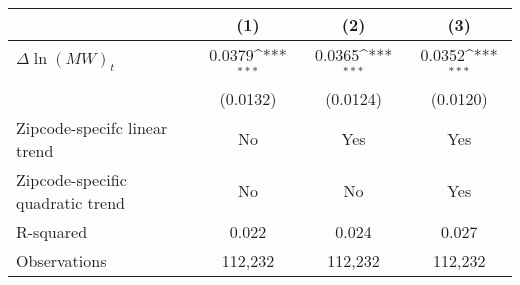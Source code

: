{
\def\sym#1{\ifmmode^{#1}\else\(^{#1}\)\fi}
\begin{tabular}{l*{3}{c}}
\hline\hline
          &\multicolumn{1}{c}{(1)}         &\multicolumn{1}{c}{(2)}         &\multicolumn{1}{c}{(3)}         \\
\hline
$\Delta \ln(MW)_{t}$&   0.0379\sym{***}&   0.0365\sym{***}&   0.0352\sym{***}\\
          & (0.0132)         & (0.0124)         & (0.0120)         \\
\hline
Zipcode-specifc linear trend&       No         &      Yes         &      Yes         \\
Zipcode-specific quadratic trend&       No         &       No         &      Yes         \\
R-squared &    0.022         &    0.024         &    0.027         \\
Observations&  112,232         &  112,232         &  112,232         \\
\hline\hline
\end{tabular}
}
